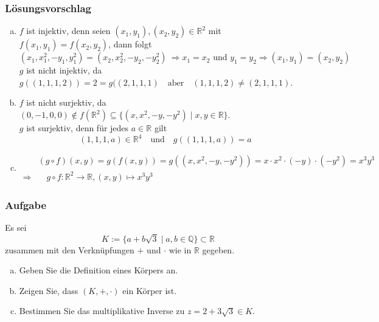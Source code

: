 \documentclass[a4paper,11pt]{scrartcl}
\newcounter{auf}
\newcommand{\Aufgabe}%
        {\addtocounter{auf}{1} \subsubsection*{\rmfamily  Aufgabe \theauf \hspace{1em}} }
\newcommand{\RR}{\mathbb{R}}
\newcommand{\Q}{\mathbb{Q}}
\begin{document}
\subsubsection*{Lösungsvorschlag}
\begin{enumerate}[a)]

\item $f$ ist injektiv, denn seien $(x_1,y_1),(x_2,y_2) \in \RR^2$ mit $f(x_1,y_1)=f(x_2,y_2)$, dann folgt
$$
(x_1,x_1^2,-y_1,y_1^2)=(x_2,x_2^2,-y_2,-y_2^2) \ \Rightarrow x_1=x_2 \text{ und } y_1=y_2 \Rightarrow (x_1,y_1)=(x_2,y_2)
$$
$g$ ist nicht injektiv, da $g((1,1,1,2))=2=g((2,1,1,1) \quad \text{aber} \quad (1,1,1,2) \ne (2,1,1,1)$.
\item $f$ ist nicht surjektiv, da $(0,-1,0,0) \notin f(\RR^2) \subseteq \{(x,x^2,-y,-y^2)\mid x,y \in \RR\} $.\\
$g$ ist surjektiv, denn für jedes $a \in \RR$ gilt
$$
(1,1,1,a) \in \RR^4 \quad \text{und} \quad g((1,1,1,a))=a
$$
\item
\begin{align*}
&(g\circ f)(x,y)=g(f(x,y))=g((x,x^2,-y,-y^2))=x\cdot x^2\cdot (-y)\cdot(-y^2)=x^3y^3\\
\Rightarrow&\quad g\circ f :\RR^2 \to \RR, (x,y) \mapsto x^3y^3
\end{align*}
\end{enumerate}



\newpage
\Aufgabe
Es sei 
$$K:=\{a+b\sqrt{3} \mid a,b \in  \Q \} \subset \RR$$
zusammen mit den Verknüpfungen $+$ und $\cdot$ wie in $\RR$ gegeben.
\begin{enumerate}[a)]
\item Geben Sie die Definition eines Körpers an.

\item Zeigen Sie, dass $(K,+,\cdot)$ ein Körper ist.

\item Bestimmen Sie das multiplikative Inverse zu $z=2+3\sqrt{3} \in K$. 

\end{enumerate}
\end{document}
